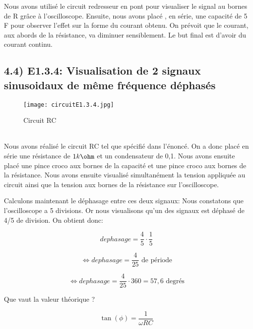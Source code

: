 \documentclass{report}
\begin{document}
Nous avons utilis\'e le circuit redresseur en pont pour visualiser le signal au bornes de R gr\^ace \`a l'oscilloscope. Ensuite, nous avons plac\'e , en s\'erie, une capacit\'e de 5 \micro F pour observer l'effet sur la forme du courant obtenu. On pr\'evoit que le courant, aux abords de la r\'esistance, va diminuer sensiblement.
Le but final est d'avoir du courant continu.

\subsection*{4.4) E1.3.4: Visualisation de 2 signaux sinuso\¨idaux de m\^eme fr\'equence d\'ephas\'es}
\hspace*{0.5cm}
\begin{figure}[ht!]
\centering
\texttt{[image: circuitE1.3.4.jpg]}
\caption{Circuit RC}
\label{overflow}
\end{figure}
\\

Nous avons r\'ealis\'e le circuit RC tel que sp\'ecifi\'e dans l'\'enonc\'e. On a donc plac\'e en s\'erie une r\'esistance de $1 k\ohm$  et un condensateur de 0,1\micro\farad. Nous avons ensuite plac\'e une pince croco aux bornes de la capacit\'e et une pince croco aux bornes de la r\'esistance. Nous avons ensuite visualis\'e simultan\'ement la tension appliqu\'ee au circuit ainsi que la tension aux bornes de la r\'esistance sur l'oscilloscope.

Calculons maintenant le d\'ephasage entre ces deux signaux:
Nous constatons que l'oscilloscope a 5 divisions.
Or nous visualisons qu'un des signaux est d\'ephas\'e  de 4/5 de division. On obtient donc:

\begin{equation}
    dephasage = \frac{4}{5} \cdot \frac{1}{5}
\end{equation}

\begin{equation}
    \Leftrightarrow dephasage = \frac{4}{25} \text{ de p\'eriode}
\end{equation}

\begin{equation}
    \Leftrightarrow dephasage = \frac{4}{25} \cdot 360 = 57,6 \text{ degr\'es}
\end{equation}

Que vaut la valeur th\'eorique ?

\begin{equation}
    \tan(\phi) = \frac{1}{\omega RC}
\end{equation}
\end{document}
